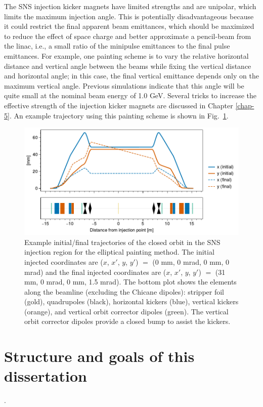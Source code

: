 The SNS injection kicker magnets have limited strengths and are unipolar, which limits the maximum injection angle. This is potentially disadvantageous because it could restrict the final apparent beam emittances, which should be maximized to reduce the effect of space charge and better approximate a pencil-beam from the linac, i.e., a small ratio of the minipulse emittances to the final pulse emittances. For example, one painting scheme is to vary the relative horizontal distance and vertical angle between the beams while fixing the vertical distance and horizontal angle; in this case, the final vertical emittance depends only on the maximum vertical angle. Previous simulations indicate that this angle will be quite small at the nominal beam energy of 1.0 GeV. Several tricks to increase the effective strength of the injection kicker magnets are discussed in Chapter \ref{chap-5}. An example trajectory using this painting scheme is shown in Fig.~\ref{fig:injection_region_trajectory}.
%
\begin{figure}[!p]
    \centering
    \includegraphics[width=\textwidth]{Images/chapter1/inj_region_elements.pdf}
    \caption{Example initial/final trajectories of the closed orbit in the SNS injection region for the elliptical painting method. The initial injected coordinates are ($x$, $x'$, $y$, $y'$) $=$ (0 mm, 0 mrad, 0 mm, 0 mrad) and the final injected coordinates are ($x$, $x'$, $y$, $y'$) $=$ (31 mm, 0 mrad, 0 mm, 1.5 mrad). The bottom plot shows the elements along the beamline (excluding the Chicane dipoles): stripper foil (gold), quadrupoles (black), horizontal kickers (blue), vertical kickers (orange), and vertical orbit corrector dipoles (green). The vertical orbit corrector dipoles provide a closed bump to assist the kickers.}
    \label{fig:injection_region_trajectory}
\end{figure}
%


\section{Structure and goals of this dissertation}\label{sec:Goals of this dissertation}.

